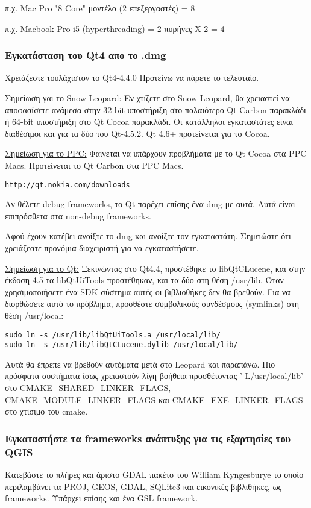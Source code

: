 π.χ. Mac Pro "8 Core" μοντέλο (2 επεξεργαστές) = 8

π.χ. Macbook Pro i5 (hyperthreading) = 2 πυρήνες  X 2 = 4

\hypertarget{toc19}{}
\subsubsection{Εγκατάσταση του Qt4 απο το .dmg}
Χρειάζεστε τουλάχιστον το Qt4-4.4.0 Προτείνω να πάρετε το τελευταίο.

\underline{Σημείωση γαι το Snow Leopard:} Εν χτίζετε στο Snow Leopard, θα χρειαστεί να αποφασίσετε ανάμεσα στην 32-bit υποστήριξη στο παλαιότερο Qt Carbon παρακλάδι ή 64-bit υποστήριξη στο Qt Cocoa παρακλάδι. Οι κατάλληλοι εγκαταστάτες είναι διαθέσιμοι και για τα δύο του Qt-4.5.2. Qt 4.6+ προτείνεται για το Cocoa. 

\underline{Σημείωση για το PPC:} Φαίνεται να υπάρχουν προβλήματα με το Qt Cocoa στα PPC Macs. Προτείνεται το Qt Carbon στα PPC Macs. 

\begin{verbatim}
http://qt.nokia.com/downloads
\end{verbatim}

Αν θέλετε debug frameworks, το Qt παρέχει επίσης ένα dmg με αυτά. Αυτά είναι επιπρόσθετα στα non-debug frameworks.

Αφού έχουν κατέβει ανοίξτε το dmg και ανοίξτε τον εγκαταστάτη. Σημειώστε ότι χρειάζεστε προνόμια διαχειριστή για να εγκαταστήσετε.

\underline{Σημείωση για το Qt:} Ξεκινώντας στο Qt4.4, προστέθηκε το libQtCLucene, και στην έκδοση 4.5 τα libQtUiTools προστέθηκαν, και τα δύο στη θέση /usr/lib. Όταν χρησιμοποιήσετε ένα SDK σύστημα αυτές οι βιβλιοθήκες δεν θα βρεθούν. Για να διορθώσετε αυτό το πρόβλημα, προσθέστε συμβολικούς συνδέσμους (symlinks) στη θέση /usr/local:

\begin{verbatim}
sudo ln -s /usr/lib/libQtUiTools.a /usr/local/lib/
sudo ln -s /usr/lib/libQtCLucene.dylib /usr/local/lib/
\end{verbatim}

Αυτά θα έπρεπε να βρεθούν αυτόματα μετά στο Leopard και παραπάνω. Πιο πρόσφατα συστήματα ίσως χρειαστούν λίγη βοήθεια προσθέτοντας '-L/usr/local/lib' στο CMAKE\_SHARED\_LINKER\_FLAGS, CMAKE\_MODULE\_LINKER\_FLAGS και CMAKE\_EXE\_LINKER\_FLAGS στο χτίσιμο του cmake.

\hypertarget{toc20}{}
\subsubsection{Εγκαταστήστε τα frameworks ανάπτυξης για τις εξαρτησίες του QGIS}
Κατεβάστε το πλήρες και άριστο GDAL πακέτο του William Kyngesburye το οποίο περιλαμβάνει τα PROJ, GEOS, GDAL, SQLite3 και εικονικές βιβλιθήκες, ως frameworks. Υπάρχει επίσης και ένα GSL framework.

